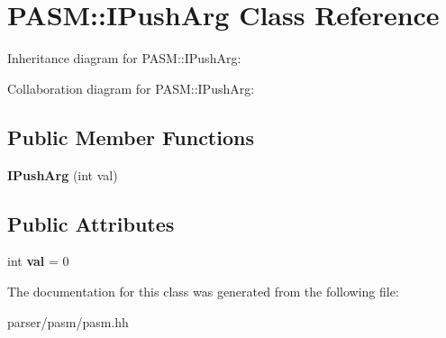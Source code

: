 \hypertarget{classPASM_1_1IPushArg}{}\section{P\+A\+SM\+:\+:I\+Push\+Arg Class Reference}
\label{classPASM_1_1IPushArg}


Inheritance diagram for P\+A\+SM\+:\+:I\+Push\+Arg\+:


Collaboration diagram for P\+A\+SM\+:\+:I\+Push\+Arg\+:
\subsection*{Public Member Functions}
\begin{DoxyCompactItemize}
\item 
\mbox{\label{classPASM_1_1IPushArg_a9f20395afaca2af7a89ad6ab07e60b02}} 
{\bfseries I\+Push\+Arg} (int val)
\end{DoxyCompactItemize}
\subsection*{Public Attributes}
\begin{DoxyCompactItemize}
\item 
\mbox{\label{classPASM_1_1IPushArg_a9b62e18f3f3bbdffca8320b0d40aa8c5}} 
int {\bfseries val} = 0
\end{DoxyCompactItemize}


The documentation for this class was generated from the following file\+:\begin{DoxyCompactItemize}
\item 
parser/pasm/pasm.\+hh\end{DoxyCompactItemize}
